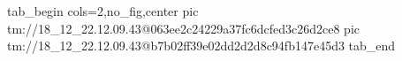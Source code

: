  
 
 
 
 

\qqSecOrig


\ifcmt
  tab_begin cols=2,no_fig,center
    pic tm://18_12_22.12.09.43@063ee2c24229a37fc6dcfed3c26d2ce8
    pic tm://18_12_22.12.09.43@b7b02ff39e02dd2d2d8c94fb147e45d3
  tab_end
\fi

